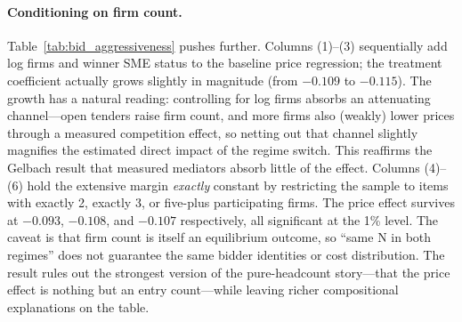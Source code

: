 \paragraph{Conditioning on firm count.}
Table~\ref{tab:bid_aggressiveness} pushes further. Columns (1)--(3) sequentially add log firms and winner SME status to the baseline price regression; the treatment coefficient actually grows slightly in magnitude (from $-0.109$ to $-0.115$). The growth has a natural reading: controlling for log firms absorbs an attenuating channel---open tenders raise firm count, and more firms also (weakly) lower prices through a measured competition effect, so netting out that channel slightly magnifies the estimated direct impact of the regime switch. This reaffirms the Gelbach result that measured mediators absorb little of the effect. Columns (4)--(6) hold the extensive margin \emph{exactly} constant by restricting the sample to items with exactly 2, exactly 3, or five-plus participating firms. The price effect survives at $-0.093$, $-0.108$, and $-0.107$ respectively, all significant at the 1\% level. The caveat is that firm count is itself an equilibrium outcome, so ``same N in both regimes'' does not guarantee the same bidder identities or cost distribution. The result rules out the strongest version of the pure-headcount story---that the price effect is nothing but an entry count---while leaving richer compositional explanations on the table.



